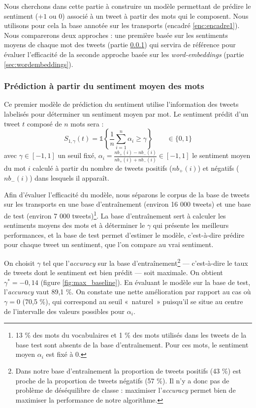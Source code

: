 \documentclass[11pt,french,french]{article}
\let\rmarkdownfootnote\footnote%
\def\footnote{\protect\rmarkdownfootnote}
\begin{document}
Nous cherchons dans cette partie à construire un modèle permettant de
prédire le sentiment (\(+1\) ou \(0\)) associé à un tweet à partir des
mots qui le composent. Nous utilisons pour cela la base annotée sur les
transports (encadré \ref{enc:encadre1}). Nous comparerons deux approches
: une première basée sur les sentiments moyens de chaque mot des tweets
(partie \ref{sec:sentiments}) qui servira de référence pour évaluer
l'efficacité de la seconde approche basée sur les \emph{word-embeddings}
(partie \ref{sec:wordembeddings}).

\subsubsection{Prédiction à partir du sentiment moyen des
mots}\label{sec:sentiments}

Ce premier modèle de prédiction du sentiment utilise l'information des
tweets labelisés pour déterminer un sentiment moyen par mot. Le
sentiment prédit d'un tweet \(t\) composé de \(n\) mots sera :
\[S_{1,\gamma}(t) = \mathds{1}\left\{ \frac{1}{n} \sum \limits_{i=1}^n \alpha_i \geq \gamma\right\}  \qquad \in \{ 0,1 \}\]
avec \(\gamma \in [-1,1]\) un seuil fixé,
\(\alpha_i = \frac{nb_+(i) - nb_-(i)}{nb_+(i) + nb_-(i)} \in [-1,1]\) le
sentiment moyen du mot \(i\) calculé à partir du nombre de tweets
positifs (\(nb_+(i)\)) et négatifs (\(nb_-(i)\)) dans lesquels il
apparaît.

Afin d'évaluer l'efficacité du modèle, nous séparons le corpus de la
base de tweets sur les transports en une base d'entraînement (environ 16
000 tweets) et une base de test (environ 7 000 tweets)\footnote{13 \%
  des mots du vocabulaires et 1 \% des mots utilisés dans les tweets de
  la base test sont absents de la base d'entraînement. Pour ces mots, le
  sentiment moyen \(\alpha_i\) est fixé à 0.}. La base d'entraînement
sert à calculer les sentiments moyens des mots et à déterminer le
\(\gamma\) qui présente les meilleurs performances, et la base de test
permet d'estimer le modèle, c'est-à-dire prédire pour chaque tweet un
sentiment, que l'on compare au vrai sentiment.

On choisit \(\gamma\) tel que l'\emph{accuracy} sur la base
d'entraînement\footnote{Dans notre base d'entraînement la proportion de
  tweets positifs (43 \%) est proche de la proportion de tweets négatifs
  (57 \%). Il n'y a donc pas de problème de déséquilibre de classe :
  maximiser l'\emph{accuracy} permet bien de maximiser la performance de
  notre algorithme.} --- c'est-à-dire le taux de tweets dont le
sentiment est bien prédit --- soit maximale. On obtient
\(\gamma^* = -0,14\) (figure \ref{fig:max_baseline}). En évaluant le
modèle sur la base de test, l'\emph{accuracy} vaut 89,1 \%. On constate
une nette amélioration par rapport au cas où \(\gamma = 0\) (70,5 \%),
qui correspond au seuil «~naturel~» puisqu'il se situe au centre de
l'intervalle des valeurs possibles pour \(\alpha_i\).
\end{document}
